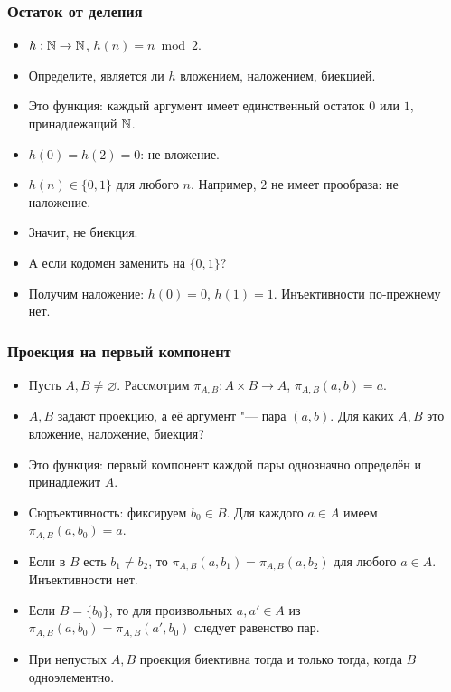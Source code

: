 \documentclass[10pt]{beamer}
\begin{document}
\begin{frame}
    \frametitle{Остаток от деления}
    \begin{itemize}
        \item $h:\mathbb{N}\to\mathbb{N}$, $h(n)=n\bmod2$.
        \item Определите, является ли $h$ вложением, наложением, биекцией.
        \item<2-> Это функция: каждый аргумент имеет единственный остаток $0$ или $1$, принадлежащий $\mathbb{N}$.
        \item<3-> $h(0)=h(2)=0$: не вложение.
        \item<4-> $h(n)\in\{0,1\}$ для любого $n$. Например, $2$ не имеет прообраза: не наложение.
        \item<5-> Значит, не биекция.
        \item<6-> А если кодомен заменить на $\{0,1\}$?
        \item<7-> Получим наложение: $h(0)=0$, $h(1)=1$. Инъективности по-прежнему нет.
    \end{itemize}
\end{frame}

\begin{frame}
    \frametitle{Проекция на первый компонент}
    \begin{itemize}
        \item Пусть $A,B\neq\varnothing$. Рассмотрим $\pi_{A,B}:A\times B\to A$, $\pi_{A,B}(a,b)=a$.
        \item $A,B$ задают проекцию, а её аргумент "--- пара $(a,b)$. Для каких $A,B$ это вложение, наложение, биекция?
        \item<2-> Это функция: первый компонент каждой пары однозначно определён и принадлежит $A$.
        \item<3-> Сюръективность: фиксируем $b_0\in B$. Для каждого $a\in A$ имеем $\pi_{A,B}(a,b_0)=a$.
        \item<4-> Если в $B$ есть $b_1\neq b_2$, то $\pi_{A,B}(a,b_1)=\pi_{A,B}(a,b_2)$ для любого $a\in A$. Инъективности нет.
        \item<5-> Если $B=\{b_0\}$, то для произвольных $a,a'\in A$ из $\pi_{A,B}(a,b_0)=\pi_{A,B}(a',b_0)$ следует равенство пар.
        \item<6-> При непустых $A,B$ проекция биективна тогда и только тогда, когда $B$ одноэлементно.
    \end{itemize}
\end{frame}
\end{document}
